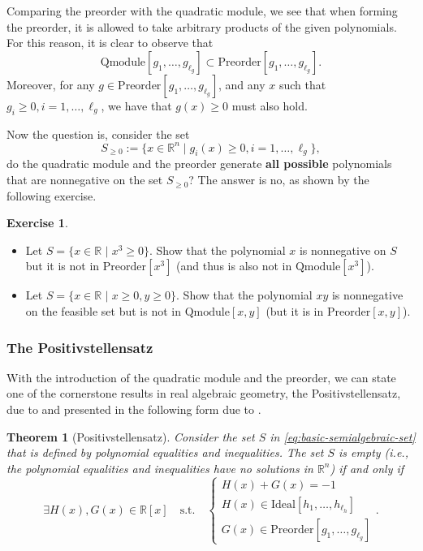 \documentclass[
]{book}
\newtheorem{theorem}{Theorem}[chapter]
\theoremstyle{definition}
\theoremstyle{definition}
\theoremstyle{definition}
\newtheorem{exercise}{Exercise}[chapter]
\theoremstyle{definition}
\theoremstyle{remark}
\begin{document}
Comparing the preorder with the quadratic module, we see that when forming the preorder, it is allowed to take arbitrary products of the given polynomials. For this reason, it is clear to observe that
\[
\mathrm{Qmodule}[g_1,\dots,g_{\ell_g}] \subset \mathrm{Preorder}[g_1,\dots,g_{\ell_g}].
\]
Moreover, for any \(g \in \mathrm{Preorder}[g_1,\dots,g_{\ell_g}]\), and any \(x\) such that \(g_i \geq 0, i=1,\dots,\ell_g\), we have that \(g(x) \geq 0\) must also hold.

Now the question is, consider the set
\[
S_{\geq 0} := \{ x \in \mathbb{R}^{n} \mid g_i(x) \geq 0, i=1,\dots,\ell_g \},
\]
do the quadratic module and the preorder generate \textbf{all possible} polynomials that are nonnegative on the set \(S_{\geq 0}\)? The answer is no, as shown by the following exercise.

\begin{exercise}
\leavevmode

\begin{itemize}
\item
  Let \(S = \{ x \in \mathbb{R}^{} \mid x^3 \geq 0 \}\). Show that the polynomial \(x\) is nonnegative on \(S\) but it is not in \(\mathrm{Preorder}[x^3]\) (and thus is also not in \(\mathrm{Qmodule}[x^3]\)).
\item
  Let \(S = \{ x \in \mathbb{R}^{}\mid x\geq 0, y\geq 0 \}\). Show that the polynomial \(xy\) is nonnegative on the feasible set but is not in \(\mathrm{Qmodule}[x,y]\) (but it is in \(\mathrm{Preorder}[x,y]\)).
\end{itemize}

\end{exercise}

\subsubsection{The Positivstellensatz}\label{the-positivstellensatz}

With the introduction of the quadratic module and the preorder, we can state one of the cornerstone results in real algebraic geometry, the Positivstellensatz, due to \citep{stengle74ma-nullstellensatz} and presented in the following form due to \citep{bochnak13book-real}.

\begin{theorem}[Positivstellensatz]
\protect\hypertarget{thm:Positivstellensatz}{}\label{thm:Positivstellensatz}Consider the set \(S\) in \eqref{eq:basic-semialgebraic-set} that is defined by polynomial equalities and inequalities. The set \(S\) is empty (i.e., the polynomial equalities and inequalities have no solutions in \(\mathbb{R}^{n}\)) if and only if
\[
\exists H(x), G(x) \in \mathbb{R}[x] \quad \mathrm{s.t.}\quad \begin{cases}
H(x) + G(x) = -1 \\
H(x) \in \mathrm{Ideal}[h_1,\dots,h_{\ell_h}] \\
G(x) \in \mathrm{Preorder}[g_1,\dots,g_{\ell_g}]
\end{cases}.
\]
\end{theorem}
\end{document}
